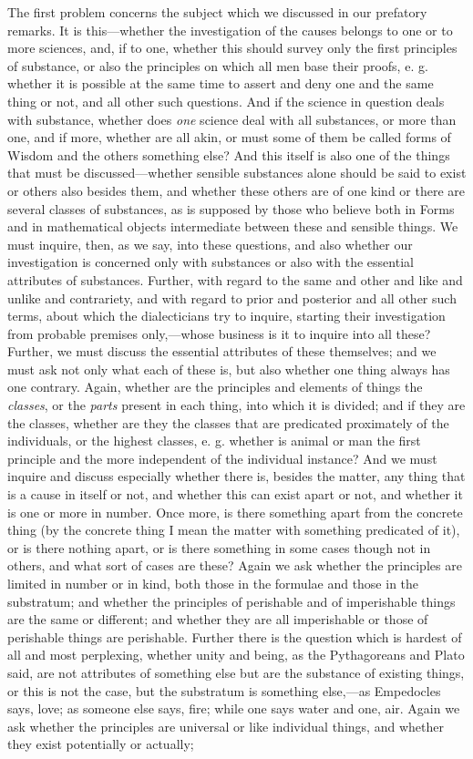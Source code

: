 The first problem concerns the subject which we discussed in our prefatory remarks. It is this—whether the investigation of the causes belongs to one or to more sciences, and, if to one, whether this should survey only the first principles of substance, or also the principles on which all men base their proofs, e. g. whether it is possible at the same time to assert and deny one and the same thing or not, and all other such questions. And if the science in question deals with substance, whether does \emph{one} science deal with all substances, or more than one, and if more, whether are all akin, or must some of them be called forms of Wisdom and the others something else? And this itself is also one of the things that must be discussed—whether sensible substances alone should be said to exist or others also besides them, and whether these others are of one kind or there are several classes of substances, as is supposed by those who believe both in Forms and in mathematical objects intermediate between these and sensible things. We must inquire, then, as we say, into these questions, and also whether our investigation is concerned only with substances or also with the essential attributes of substances. Further, with regard to the same and other and like and unlike and contrariety, and with regard to prior and posterior and all other such terms, about which the dialecticians try to inquire, starting their investigation from probable premises only,—whose business is it to inquire into all these? Further, we must discuss the essential attributes of these themselves; and we must ask not only what each of these is, but also whether one thing always has one contrary. Again, whether are the principles and elements of things the \emph{classes}, or the \emph{parts} present in each thing, into which it is divided; and if they are the classes, whether are they the classes that are predicated proximately of the individuals, or the highest classes, e. g. whether is animal or man the first principle and the more independent of the individual instance? And we must inquire and discuss especially whether there is, besides the matter, any thing that is a cause in itself or not, and whether this can exist apart or not, and whether it is one or more in number. Once more, is there something apart from the concrete thing (by the concrete thing I mean the matter with something predicated of it), or is there nothing apart, or is there something in some cases though not in others, and what sort of cases are these? Again we ask whether the principles are limited in number or in kind, both those in the formulae and those in the substratum; and whether the principles of perishable and of imperishable things are the same or different; and whether they are all imperishable or those of perishable things are perishable. Further there is the question which is hardest of all and most perplexing, whether unity and being, as the Pythagoreans and Plato said, are not attributes of something else but are the substance of existing things, or this is not the case, but the substratum is something else,—as Empedocles says, love; as someone else says, fire; while one says water and one, air. Again we ask whether the principles are universal or like individual things, and whether they exist potentially or actually; 
